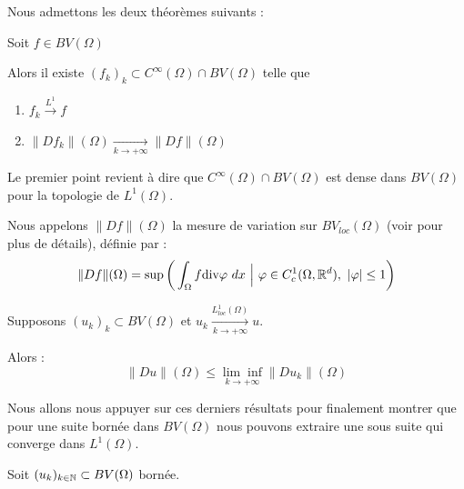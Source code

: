 \vspace{1em}

Nous admettons les deux théorèmes suivants :

\begin{theorembox}
\begin{theorem}
    Soit $f \in BV(\Omega)$

    Alors il existe $(f_k)_k \subset C^{\infty}(\Omega) \cap BV(\Omega)$ telle que 
    \begin{enumerate}
        \item $f_k \xrightarrow{L^1} f$
        \item $\| Df_k \| (\Omega) \underset{k \to +\infty}{\longrightarrow} \| Df \| (\Omega)$
    \end{enumerate}

\end{theorem}
\end{theorembox}

\begin{remarkbox}
\begin{remark}
    Le premier point revient à dire que $C^{\infty}(\Omega) \cap BV(\Omega)$ est dense dans $BV(\Omega)$ pour la topologie de $L^1(\Omega)$.

    \vspace{1em}
    Nous appelons $\|Df\|(\Omega)$ la mesure de variation sur $BV_{loc}(\Omega)$ (voir \cite{Evans} pour plus de détails), définie par :
    $$\|Df\| (\Omega) = \sup \bigg(\int_{\Omega} f \text{div}\varphi \ dx \ \Big| \ \varphi \in C^1_c(\Omega,\mathbb{R}^d), \ |\varphi| \leq 1 \bigg)$$
\end{remark}
\end{remarkbox}

\begin{theorembox}
\begin{theorem}
    
    Supposons $(u_k)_k \subset BV(\Omega)$ et $u_k \xrightarrow[k \to +\infty]{L^1_{loc}(\Omega)} u$.

    Alors :
    $$ \| Du \|(\Omega) \leq \underset{k \to +\infty}{\lim \inf}\|Du_k\|(\Omega) $$

\end{theorem}
\end{theorembox}

Nous allons nous appuyer sur ces derniers résultats pour finalement montrer que pour une suite bornée dans $BV(\Omega)$ nous pouvons extraire une sous suite qui converge dans $L^1(\Omega)$. 

Soit $(u_k)_{k \in \mathbb{N}} \subset BV(\Omega)$ bornée.

